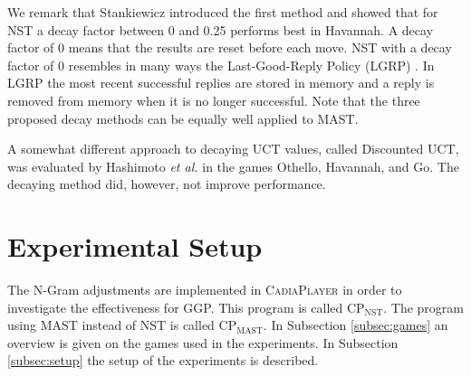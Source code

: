 \documentclass[journal]{IEEEtran}
\begin{document}



We remark that Stankiewicz \cite{havannahThesis} introduced the first method and showed that for NST a decay factor between 0 and 0.25 performs best in Havannah. A decay factor of 0 means that the results are reset before each move. NST with a decay factor of 0 resembles in many ways the Last-Good-Reply Policy (LGRP) \cite{DrakeLastGoodReply,LGRBaier}. In LGRP the most recent successful replies are stored in memory  and a reply is removed from memory when it is no longer successful. Note that the three proposed decay methods can be equally well applied to MAST.

A somewhat different approach to decaying UCT values, called Discounted UCT, was evaluated by Hashimoto \emph{et al.} \cite{acceleratedUCT} in the games Othello, Havannah, and Go. The decaying method did, however, not improve performance. 

\section{Experimental Setup}

\label{sec:setup}
The N-Gram adjustments are implemented in \textsc{CadiaPlayer} in order to investigate the effectiveness for GGP. This program is called CP$_{\textrm{NST}}$. The program using MAST instead of NST is called CP$_{\textrm{MAST}}$. In Subsection \ref{subsec:games} an overview is given on the games used in the experiments. In Subsection \ref{subsec:setup} the setup of the experiments is described.
\end{document}
